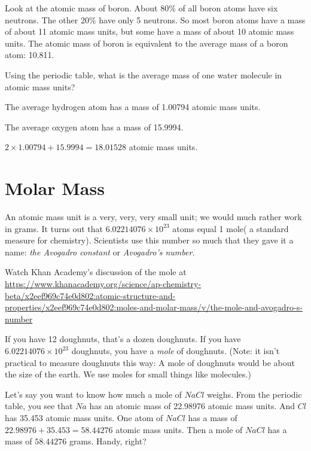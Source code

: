 Look at the atomic mass of boron. About 80\% of all boron atoms have
six neutrons. The other 20\% have only 5 neutrons. So most boron atoms
have a mass of about 11 atomic mass units, but some have a mass of
about 10 atomic mass units. The atomic mass of boron is equivalent to the average
mass of a boron atom: 10.811.

\begin{Exercise}[title={Mass of a Water Molecule}, label=water_mass]
  
Using the periodic table, what is the average mass of one water molecule in atomic mass units?

\end{Exercise}
\begin{Answer}[ref=water_mass]

  The average hydrogen atom has a mass of 1.00794 atomic mass units.

  The average oxygen atom has a mass of 15.9994.

  $2 \times 1.00794 + 15.9994 = 18.01528$ atomic mass units.
   
\end{Answer}

\section{Molar Mass}

An atomic mass unit is a very, very, very small unit; we would much
rather work in grams.  It turns out that $6.02214076 \times 10^{23}$
atoms equal 1 mole( a standard measure for chemistry). Scientists use this number so much
that they gave it a name: \textit{the Avogadro constant} or
\textit{Avogadro's number}.

Watch Khan Academy's discussion of the mole at \url{https://www.khanacademy.org/science/ap-chemistry-beta/x2eef969c74e0d802:atomic-structure-and-properties/x2eef969c74e0d802:moles-and-molar-mass/v/the-mole-and-avogadro-s-number}

If you have 12 doughnuts, that's a dozen doughnuts.  If you have
$6.02214076 \times 10^{23}$ doughnuts, you have a \textit{mole} of
doughnuts. (Note: it isn't practical to measure doughnuts this
way: A mole of doughnuts would be about the size of the earth. We use
moles for small things like molecules.)

Let's say you want to know how much a mole of $NaCl$ weighs. From the
periodic table, you see that $Na$ has an atomic mass of 22.98976
atomic mass units. And $Cl$ has 35.453 atomic mass units.  One atom of
$NaCl$ has a mass of $22.98976 + 35.453 = 58.44276$ atomic mass units.
Then a mole of $NaCl$ has a mass of $58.44276$ grams. Handy, right?

